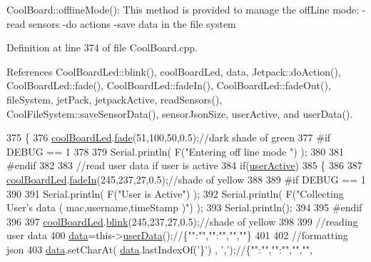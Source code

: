 Cool\+Board\+::offline\+Mode()\+: This method is provided to manage the off\+Line mode\+: -\/read sensors -\/do actions -\/save data in the file system 

Definition at line 374 of file Cool\+Board.\+cpp.



References Cool\+Board\+Led\+::blink(), cool\+Board\+Led, data, Jetpack\+::do\+Action(), Cool\+Board\+Led\+::fade(), Cool\+Board\+Led\+::fade\+In(), Cool\+Board\+Led\+::fade\+Out(), file\+System, jet\+Pack, jetpack\+Active, read\+Sensors(), Cool\+File\+System\+::save\+Sensor\+Data(), sensor\+Json\+Size, user\+Active, and user\+Data().


\begin{DoxyCode}
375 \{
376     \hyperlink{classCoolBoard_a1b1d3c684a5baa56b08486e192fd8e97}{coolBoardLed}.\hyperlink{classCoolBoardLed_af1cacbaa88db8bcf6042c1083ba41155}{fade}(51,100,50,0.5);\textcolor{comment}{//dark shade of green  }
377 \textcolor{preprocessor}{#if DEBUG == 1  }
378     
379     Serial.println( F(\textcolor{stringliteral}{"Entering off line mode "}) ); 
380     
381 \textcolor{preprocessor}{#endif}
382 
383     \textcolor{comment}{//read user data if user is active}
384     \textcolor{keywordflow}{if}(\hyperlink{classCoolBoard_a6395459131d6889a3005f79c7a35e964}{userActive})
385     \{
386 
387         \hyperlink{classCoolBoard_a1b1d3c684a5baa56b08486e192fd8e97}{coolBoardLed}.\hyperlink{classCoolBoardLed_ab778f5e7bed0ab74e3906d82110493c3}{fadeIn}(245,237,27,0.5);\textcolor{comment}{//shade of yellow}
388 
389 \textcolor{preprocessor}{    #if DEBUG == 1}
390         
391         Serial.println( F(\textcolor{stringliteral}{"User is Active"}) );
392         Serial.println( F(\textcolor{stringliteral}{"Collecting User's data ( mac,username,timeStamp )"}) );
393         Serial.println();
394 
395 \textcolor{preprocessor}{    #endif}
396 
397         \hyperlink{classCoolBoard_a1b1d3c684a5baa56b08486e192fd8e97}{coolBoardLed}.\hyperlink{classCoolBoardLed_a96e1ea13003eee34c9dbcef340404426}{blink}(245,237,27,0.5);\textcolor{comment}{//shade of yellow   }
398 
399         \textcolor{comment}{//reading user data}
400         \hyperlink{classCoolBoard_a427fb753dd8575bdf821c70a5c63d695}{data}=this->\hyperlink{classCoolBoard_ae7358fb6e623cfc81b775f5f1734909b}{userData}();\textcolor{comment}{//\{"":"","":"","",""\}}
401 
402         \textcolor{comment}{//formatting json }
403         \hyperlink{classCoolBoard_a427fb753dd8575bdf821c70a5c63d695}{data}.setCharAt( \hyperlink{classCoolBoard_a427fb753dd8575bdf821c70a5c63d695}{data}.lastIndexOf(\textcolor{charliteral}{'\}'}) , \textcolor{charliteral}{','});\textcolor{comment}{//\{"":"","":"","","",}

\end{DoxyCode}
